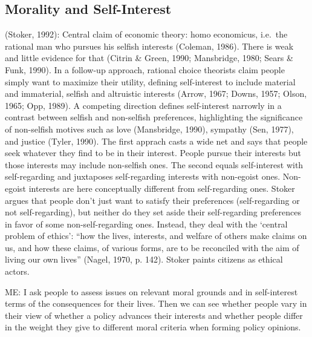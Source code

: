 \documentclass[12pt,econ]{sources/authesis}
\begin{document}
\hypertarget{framing-theory-morality-self_interest}{%
\subsection{Morality and Self-Interest}\label{framing-theory-morality-self_interest}}

(Stoker, 1992):
Central claim of economic theory: homo economicus, i.e.~the rational man who pursues his selfish interests (Coleman, 1986). There is weak and little evidence for that (Citrin \& Green, 1990; Mansbridge, 1980; Sears \& Funk, 1990). In a follow-up approach, rational choice theorists claim people simply want to maximize their utility, defining self-interest to include material and immaterial, selfish and altruistic interests (Arrow, 1967; Downs, 1957; Olson, 1965; Opp, 1989). A competing direction defines self-interest narrowly in a contrast between selfish and non-selfish preferences, highlighting the significance of non-selfish motives such as love (Mansbridge, 1990), sympathy (Sen, 1977), and justice (Tyler, 1990). The first apprach casts a wide net and says that people seek whatever they find to be in their interest. People pursue their interests but those interests may include non-selfish ones. The second equals self-interest with self-regarding and juxtaposes self-regarding interests with non-egoist ones. Non-egoist interests are here conceptually different from self-regarding ones. Stoker argues that people don't just want to satisfy their preferences (self-regarding or not self-regarding), but neither do they set aside their self-regarding preferences in favor of some non-self-regarding ones. Instead, they deal with the `central problem of ethics': ``how the lives, interests, and welfare of others make claims on us, and how these claims, of various forms, are to be reconciled with the aim of living our own lives'' (Nagel, 1970, p. 142). Stoker paints citizens as ethical actors.

ME: I ask people to assess issues on relevant moral grounds and in self-interest terms of the consequences for their lives. Then we can see whether people vary in their view of whether a policy advances their interests and whether people differ in the weight they give to different moral criteria when forming policy opinions.
\end{document}
